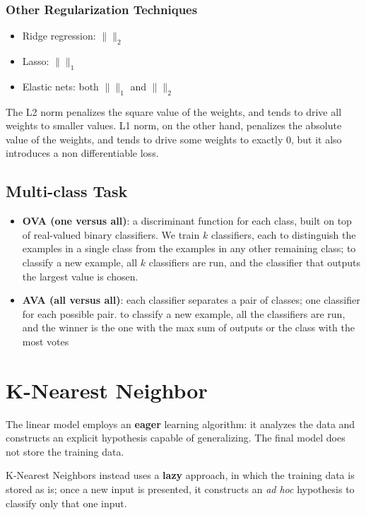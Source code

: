 \subsubsection{Other Regularization Techniques}

\begin{itemize}
    \item Ridge regression: $\| \|_2$
    \item Lasso: $\| \|_1$
    \item Elastic nets: both $\| \|_1$ and $\| \|_2$
\end{itemize}

The L2 norm penalizes the square value of the weights, and tends to drive all weights to smaller values. L1 norm, on the other hand, penalizes the absolute value of the weights, and tends to drive some weights to exactly 0, but it also introduces a non differentiable loss.

\subsection{Multi-class Task}

\begin{itemize}
    \item \textbf{OVA (one versus all)}: a discriminant function for each class, built on top of real-valued binary classifiers.
    We train $k$ classifiers, each to distinguish the examples in a single class from the examples in any other remaining class; to classify a new example, all $k$ classifiers are run, and the classifier that outputs the largest value is chosen.

    \item \textbf{AVA (all versus all)}: each classifier separates a pair of classes; one classifier for each possible pair. to classify a new example, all the classifiers are run, and the winner is the one with the max sum of outputs or the class with the most votes
\end{itemize}

\section{K-Nearest Neighbor}

The linear model employs an \textbf{eager} learning algorithm: it analyzes the data and constructs an explicit hypothesis capable of generalizing. The final model does not store the training data.

K-Nearest Neighbors instead uses a \textbf{lazy} approach, in which the training data is stored as is; once a new input is presented, it constructs an \textit{ad hoc} hypothesis to classify only that one input.

